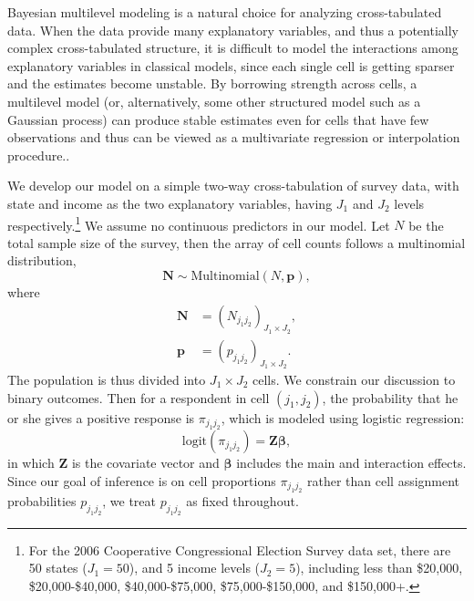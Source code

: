 \documentclass[sii]{ipart}
\begin{document}
Bayesian multilevel modeling is a natural choice for analyzing cross-tabulated
data. When the data provide many explanatory variables, and thus a potentially
complex cross-tabulated structure, it is difficult to model the interactions
among explanatory variables in classical models, since each single cell is
getting sparser and the estimates become unstable. By borrowing strength across
cells, a multilevel model (or, alternatively, some other structured model such as
a Gaussian process) can produce stable estimates even for cells that have few
observations and thus can be viewed as a multivariate regression or interpolation
procedure..

We develop our model on a simple two-way cross-tabulation of survey data, with
state and income as the two explanatory variables, having $J_1$ and $J_2$ levels
respectively.\footnote{For the 2006 Cooperative Congressional Election Survey
  data set, there are 50 states ($J_1=50$), and 5 income levels ($J_2=5$),
  including less than \$20,000, \$20,000-\$40,000, \$40,000-\$75,000,
  \$75,000-\$150,000, and \$150,000+.} We assume no continuous predictors in our
model. Let $N$ be the total sample size of the survey, then the array of cell
counts follows a multinomial distribution,
\[\bm{N}\sim \text{Multinomial}(N, \bm{p}),\]
where
\begin{align*}
  \bm{N}&=(N_{j_1j_2})_{J_1\times J_2},\\
  \bm{p}&=(p_{j_1j_2})_{J_1\times J_2}.
\end{align*}
The population is thus divided into $J_1\times J_2$ cells. We
constrain our discussion to binary outcomes. Then for a respondent in cell $(j_1,
j_2)$, the probability that he or she gives a positive response is \(\pi_{j_1j_2}\),
which is modeled using logistic regression:
$$
\text{logit}(\pi_{j_1j_2})=\bm Z\bm\beta,
$$
in which $\bm Z$ is the covariate vector and $\bm\beta$ includes the main and
interaction effects. Since our goal of inference is on cell proportions
$\pi_{j_1j_2}$ rather than cell assignment probabilities $p_{j_1j_2}$, we treat
$p_{j_1j_2}$ as fixed throughout.
\end{document}
